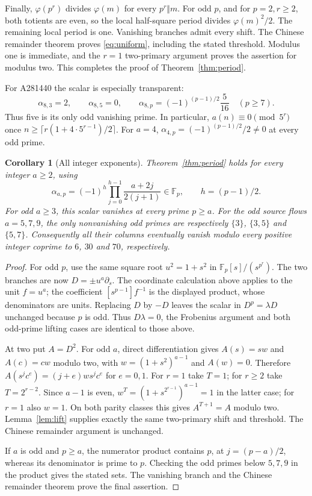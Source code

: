\documentclass[11pt]{article}
\newtheorem{corollary}{Corollary}
\newcommand{\FF}{\mathbb F}
\begin{document}
Finally, $\varphi(p^r)$ divides $\varphi(m)$ for every $p^r\Vert m$.
For odd $p$, and for $p=2,r\ge2$, both totients are even, so the local
half-square period divides $\varphi(m)^2/2$. The remaining local period
is one. Vanishing branches admit every shift. The Chinese remainder
theorem proves \eqref{eq:uniform}, including the stated threshold.
Modulus one is immediate, and the $r=1$ two-primary argument proves
the assertion for modulus two. This completes the proof of
Theorem~\ref{thm:period}.

For A281440 the scalar is especially transparent:
\[
 \alpha_{8,3}=2,\qquad \alpha_{8,5}=0,\qquad
 \alpha_{8,p}=(-1)^{(p-1)/2}\frac5{16}\quad(p\ge7).
\]
Thus five is its only odd vanishing prime. In particular,
$a(n)\equiv0\pmod{5^r}$ once
$n\ge\lceil r(1+4\cdot5^{r-1})/2\rceil$.
For $a=4$, $\alpha_{4,p}=(-1)^{(p-1)/2}/2\ne0$ at every odd prime.

\begin{corollary}[All integer exponents]\label{cor:odd}
Theorem~\ref{thm:period} holds for every integer $a\ge2$, using
\[
 \alpha_{a,p}=(-1)^h\prod_{j=0}^{h-1}\frac{a+2j}{2(j+1)}\in\FF_p,
 \qquad h=(p-1)/2.
\]
For odd $a\ge3$, this scalar vanishes at every prime $p\ge a$.
For the odd source flows $a=5,7,9$, the only nonvanishing odd primes
are respectively $\{3\}$, $\{3,5\}$ and $\{5,7\}$.
Consequently all their columns eventually vanish modulo every positive
integer coprime to $6$, $30$ and $70$, respectively.
\end{corollary}
\begin{proof}
For odd $p$, use the same square root $u^2=1+s^2$ in $\FF_p[s]/(s^{p^r})$.
The two branches are now $D=\pm u^a\partial_s$.
The coordinate calculation above applies to the unit $f=u^a$; the coefficient
$[s^{p-1}]f^{-1}$ is the displayed product, whose denominators are units.
Replacing $D$ by $-D$ leaves the scalar in $D^p=\lambda D$ unchanged because
$p$ is odd. Thus $D\lambda=0$, the Frobenius argument and both odd-prime
lifting cases are identical to those above.

At two put $A=D^2$. For odd $a$, direct differentiation gives
$A(s)=sw$ and $A(c)=cw$ modulo two, with $w=(1+s^2)^{a-1}$ and $A(w)=0$.
Therefore
$A(s^jc^e)=(j+e)w s^jc^e$ for $e=0,1$.
For $r=1$ take $T=1$; for $r\ge2$ take $T=2^{r-2}$.
Since $a-1$ is even,
$w^T=(1+s^{2^{r-1}})^{a-1}=1$ in the latter case; for $r=1$ also $w=1$.
On both parity classes this gives $A^{T+1}=A$ modulo two.
Lemma~\ref{lem:lift} supplies exactly the same two-primary shift and threshold.
The Chinese remainder argument is unchanged.

If $a$ is odd and $p\ge a$, the numerator product contains $p$, at
$j=(p-a)/2$, whereas its denominator is prime to $p$.
Checking the odd primes below $5,7,9$ in the product gives the stated sets.
The vanishing branch and the Chinese remainder theorem prove the final assertion.
\end{proof}
\end{document}

